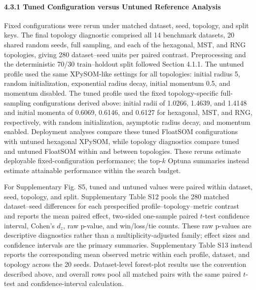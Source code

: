 \documentclass[
]{article}
\providecommand{\DIFadd}[1]{{\protect\color{blue} #1}} %
\providecommand{\DIFaddbegin}{} %
\providecommand{\DIFaddend}{} %
\begin{document}
\paragraph{4.3.1 Tuned Configuration versus Untuned Reference
Analysis}\label{tuned-configuration-versus-untuned-reference-analysis}

 \DIFaddbegin \DIFadd{Fixed configurations were rerun under matched dataset, seed, topology,
and split keys. The final topology diagnostic comprised all 14 benchmark
datasets, 20 shared random seeds, full sampling, and each of the
hexagonal, MST, and RNG topologies, giving 280 dataset--seed units per
paired contrast. Preprocessing and the deterministic 70/30
train--holdout split followed Section 4.1.1. The untuned profile used
the same XPySOM-like settings for all topologies: initial radius 5,
random initialization, exponential radius decay, initial momentum 0.5,
and momentum disabled. The tuned profile used the fixed
topology-specific full-sampling configurations derived above: initial
radii of 1.0266, 1.4639, and 1.4148 and initial momenta of 0.6069,
0.6146, and 0.6127 for hexagonal, MST, and RNG, respectively, with
random initialization, asymptotic radius decay, and momentum enabled.
Deployment analyses compare these tuned FloatSOM configurations with
untuned hexagonal XPySOM, while topology diagnostics compare tuned and
untuned FloatSOM within and between topologies. These reruns estimate
deployable fixed-configuration performance; the top-\(k\) Optuna
summaries instead estimate attainable performance within the search
budget.
}\DIFaddend

 \DIFaddbegin \DIFadd{For Supplementary Fig. S5, tuned and untuned values were paired within
dataset, seed, topology, and split. Supplementary Table S12 pools the
280 matched dataset--seed differences for each prespecified
profile--topology--metric contrast and reports the mean paired effect,
two-sided one-sample paired \(t\)-test confidence interval, Cohen's
\(d_z\), raw p-value, and win/loss/tie counts. These raw p-values are
descriptive diagnostics rather than a multiplicity-adjusted family;
effect sizes and confidence intervals are the primary summaries.
Supplementary Table S13 instead reports the corresponding mean observed
metric within each profile, dataset, and topology across the 20 seeds.
Dataset-level }\DIFaddend forest-plot  \DIFaddbegin \DIFadd{results use the convention described above,
and overall rows pool all matched pairs with }\DIFaddend the same paired \(t\)-test
and confidence-interval  \DIFaddbegin \DIFadd{calculation}\DIFaddend .
\end{document}
